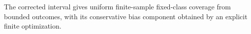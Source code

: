 The corrected interval gives uniform finite-sample fixed-class coverage from bounded outcomes, with its conservative bias component obtained by an explicit finite optimization.